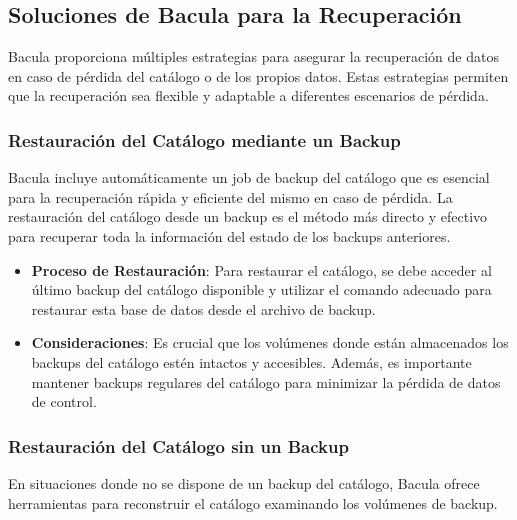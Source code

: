 \subsection{Soluciones de Bacula para la Recuperación}

Bacula proporciona múltiples estrategias para asegurar la recuperación de datos en caso de pérdida del catálogo o de los propios datos. Estas estrategias permiten que la recuperación sea flexible y adaptable a diferentes escenarios de pérdida.

\subsubsection{Restauración del Catálogo mediante un Backup}

Bacula incluye automáticamente un job de backup del catálogo que es esencial para la recuperación rápida y eficiente del mismo en caso de pérdida. La restauración del catálogo desde un backup es el método más directo y efectivo para recuperar toda la información del estado de los backups anteriores.

\begin{itemize}
    \item \textbf{Proceso de Restauración}: Para restaurar el catálogo, se debe acceder al último backup del catálogo disponible y utilizar el comando adecuado para restaurar esta base de datos desde el archivo de backup.
    \item \textbf{Consideraciones}: Es crucial que los volúmenes donde están almacenados los backups del catálogo estén intactos y accesibles. Además, es importante mantener backups regulares del catálogo para minimizar la pérdida de datos de control.
\end{itemize}

\subsubsection{Restauración del Catálogo sin un Backup}

En situaciones donde no se dispone de un backup del catálogo, Bacula ofrece herramientas para reconstruir el catálogo examinando los volúmenes de backup.

